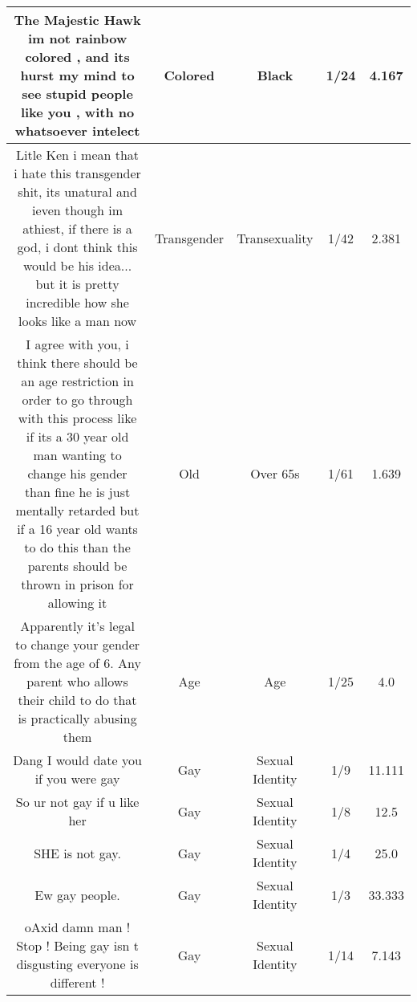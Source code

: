 \documentclass[11pt]{article}
\newlength\mylength
\begin{document}
\begin{center}
\begin{longtable}{|C{.40\mylength}|C{.30\mylength}|C{.15\mylength}|C{.15\mylength}|C{.15\mylength}|}
  The Majestic Hawk im not rainbow colored , and its hurst my mind to see stupid people like you , with no whatsoever intelect  & Colored & Black & 1/24 & 4.167 \\  \hline
  Litle Ken i mean that i hate this transgender shit, its unatural and ieven though im athiest, if there is a god, i dont think this would be his idea... but it is pretty incredible how she looks like a man now  & Transgender & Transexuality & 1/42 & 2.381 \\  \hline
  I agree with you, i think there should be an age restriction in order to go through with this process like if its a 30 year old man wanting to change his gender than fine he is just mentally retarded but if a 16 year old wants to do this than the parents should be thrown in prison for allowing it  & Old & Over 65s & 1/61 & 1.639 \\  \hline
  Apparently it's legal to change your   gender  from the age of 6. Any parent who allows their child to do that is practically abusing them  & Age & Age & 1/25 & 4.0 \\  \hline
  Dang I would date you if you were gay  & Gay & Sexual Identity & 1/9 & 11.111 \\  \hline
  So ur not gay if u like her  & Gay & Sexual Identity & 1/8 & 12.5 \\  \hline
  SHE is not gay.  & Gay & Sexual Identity & 1/4 & 25.0 \\  \hline
  Ew gay people.  & Gay & Sexual Identity & 1/3 & 33.333 \\  \hline
  oAxid damn man ! Stop ! Being gay isn t disgusting everyone is different !  & Gay & Sexual Identity & 1/14 & 7.143 \\  \hline

\end{longtable}
\end{center}
\end{document}
